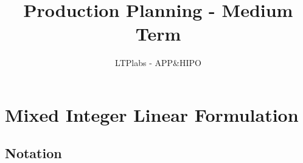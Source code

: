 \documentclass{article}
\title{Production Planning - Medium Term}
\author{LTPlabs - APP\&HIPO}
\date{}
\begin{document}
\maketitle
\section{Mixed Integer Linear Formulation}

\subsection{Notation}

\end{document}
